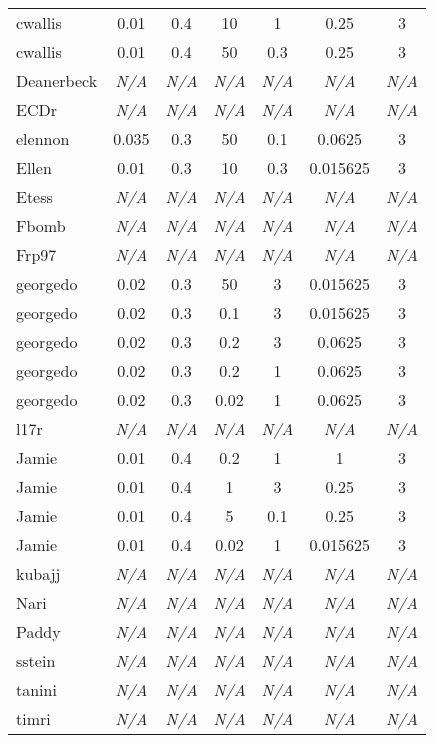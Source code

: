 \begin{longtable}{@{}lcccccc@{}}
cwallis & 0.01 & 0.4 & 10 & 1 & 0.25 & 3 \\
cwallis & 0.01 & 0.4 & 50 & 0.3 & 0.25 & 3 \\
Deanerbeck & \emph{N/A} & \emph{N/A} & \emph{N/A} & \emph{N/A} & \emph{N/A} & \emph{N/A} \\
ECDr & \emph{N/A} & \emph{N/A} & \emph{N/A} & \emph{N/A} & \emph{N/A} & \emph{N/A} \\
elennon & 0.035 & 0.3 & 50 & 0.1 & 0.0625 & 3 \\
Ellen & 0.01 & 0.3 & 10 & 0.3 & 0.015625 & 3 \\
Etess & \emph{N/A} & \emph{N/A} & \emph{N/A} & \emph{N/A} & \emph{N/A} & \emph{N/A} \\
Fbomb & \emph{N/A} & \emph{N/A} & \emph{N/A} & \emph{N/A} & \emph{N/A} & \emph{N/A} \\
Frp97 & \emph{N/A} & \emph{N/A} & \emph{N/A} & \emph{N/A} & \emph{N/A} & \emph{N/A} \\
georgedo & 0.02 & 0.3 & 50 & 3 & 0.015625 & 3 \\
georgedo & 0.02 & 0.3 & 0.1 & 3 & 0.015625 & 3 \\
georgedo & 0.02 & 0.3 & 0.2 & 3 & 0.0625 & 3 \\
georgedo & 0.02 & 0.3 & 0.2 & 1 & 0.0625 & 3 \\
georgedo & 0.02 & 0.3 & 0.02 & 1 & 0.0625 & 3 \\
l17r & \emph{N/A} & \emph{N/A} & \emph{N/A} & \emph{N/A} & \emph{N/A} & \emph{N/A} \\
Jamie & 0.01 & 0.4 & 0.2 & 1 & 1 & 3 \\
Jamie & 0.01 & 0.4 & 1 & 3 & 0.25 & 3 \\
Jamie & 0.01 & 0.4 & 5 & 0.1 & 0.25 & 3 \\
Jamie & 0.01 & 0.4 & 0.02 & 1 & 0.015625 & 3 \\
kubajj & \emph{N/A} & \emph{N/A} & \emph{N/A} & \emph{N/A} & \emph{N/A} & \emph{N/A} \\
Nari & \emph{N/A} & \emph{N/A} & \emph{N/A} & \emph{N/A} & \emph{N/A} & \emph{N/A} \\
Paddy & \emph{N/A} & \emph{N/A} & \emph{N/A} & \emph{N/A} & \emph{N/A} & \emph{N/A} \\
sstein & \emph{N/A} & \emph{N/A} & \emph{N/A} & \emph{N/A} & \emph{N/A} & \emph{N/A} \\
tanini & \emph{N/A} & \emph{N/A} & \emph{N/A} & \emph{N/A} & \emph{N/A} & \emph{N/A} \\
timri & \emph{N/A} & \emph{N/A} & \emph{N/A} & \emph{N/A} & \emph{N/A} & \emph{N/A} \\
    \end{longtable}
  